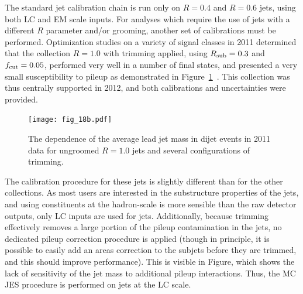 The standard jet calibration chain is run only on $R=0.4$ and $R=0.6$ jets, using both LC and EM scale inputs. For analyses which require the use of jets with a different $R$ parameter and/or grooming, another set of calibrations must be performed. Optimization studies on a variety of signal classes in 2011 determined that the collection \antikt $R=1.0$ with trimming applied, using $R_{\rm sub} = 0.3$ and $f_{\rm cut} = 0.05$, performed very well in a number of final states, and presented a very small susceptibility to pileup as demonstrated in Figure~\ref{fig:jet-reconstruction:pileup_large}~\cite{ATLAS-SS-2011}. This collection was thus centrally supported in 2012, and both calibrations and uncertainties were provided.

\begin{figure}
\centering
\texttt{[image: fig\_18b.pdf]}
\label{fig:jet-reconstruction:pileup_large}
\caption{The dependence of the average lead jet mass in dijet events in 2011 data for ungroomed \antikt $R=1.0$ jets and several configurations of trimming.}
\end{figure}


The calibration procedure for these \largeR jets is slightly different than for the other collections. As most users are interested in the substructure properties of the jets, and using constituents at the hadron-scale is more sensible than the raw detector outputs, only LC inputs are used for \largeR jets. Additionally, because trimming effectively removes a large portion of the pileup contamination in the jets, no dedicated pileup correction procedure is applied (though in principle, it is possible to easily add an areas correction to the subjets before they are trimmed, and this should improve performance). This is visible in Figure, which shows the lack of sensitivity of the jet mass to additional pileup interactions. Thus, the MC JES procedure is performed on jets at the LC scale.

